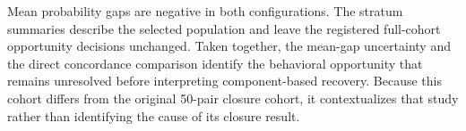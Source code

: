 Mean probability gaps are negative in both configurations. The stratum
summaries describe the selected population and leave the registered
full-cohort opportunity decisions unchanged. Taken together, the mean-gap
uncertainty and the direct concordance comparison identify the behavioral
opportunity that remains unresolved before interpreting component-based
recovery. Because this cohort differs from the original 50-pair closure
cohort, it contextualizes that study rather than identifying the cause of
its closure result.

\FloatBarrier
